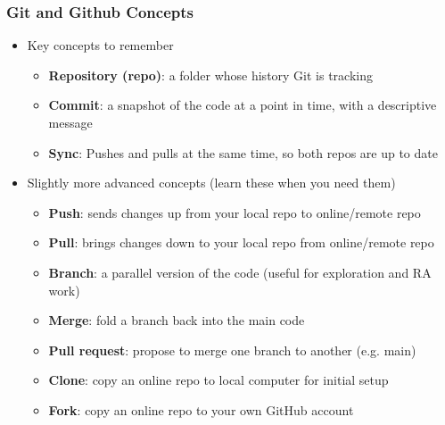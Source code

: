 \documentclass[aspectratio=169, 12pt]{beamer}
\begin{document}
\begin{frame}
\frametitle{Git and Github Concepts}

\begin{itemize}
    \item Key concepts to remember
    \begin{itemize}
        \item \textbf{Repository (repo)}: a folder whose history Git is tracking
        \item \textbf{Commit}: a snapshot of the code at a point in time, with a descriptive message
        \item \textbf{Sync}: Pushes and pulls at the same time, so both repos are up to date
    \end{itemize}\vfill
    \item Slightly more advanced concepts {\color{gray}(learn these when you need them)}
    \begin{itemize}
        \item \textbf{Push}: sends changes up from your local repo to online/remote repo
        \item \textbf{Pull}: brings changes down to your local repo from online/remote repo
        \item \textbf{Branch}: a parallel version of the code (useful for exploration and RA work)
        \item \textbf{Merge}: fold a branch back into the main code
        \item \textbf{Pull request}: propose to merge one branch to another (e.g. main)
        \item \textbf{Clone}: copy an online repo to local computer for initial setup
        \item \textbf{Fork}: copy an online repo to your own GitHub account
    \end{itemize}
\end{itemize}
\end{frame}
\end{document}
